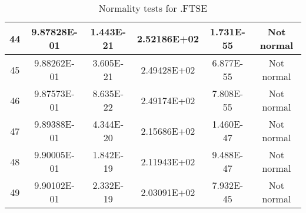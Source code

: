 \begin{table}[h]
\begin{tabular}{|c|c|c|c|c|c|}
		44 & 9.87828E-01 & 1.443E-21 & 2.52186E+02 & 1.731E-55 & Not normal\\\hline
		45 & 9.88262E-01 & 3.605E-21 & 2.49428E+02 & 6.877E-55 & Not normal\\\hline
		46 & 9.87573E-01 & 8.635E-22 & 2.49174E+02 & 7.808E-55 & Not normal\\\hline
		47 & 9.89388E-01 & 4.344E-20 & 2.15686E+02 & 1.460E-47 & Not normal\\\hline
		48 & 9.90005E-01 & 1.842E-19 & 2.11943E+02 & 9.488E-47 & Not normal\\\hline
		49 & 9.90102E-01 & 2.332E-19 & 2.03091E+02 & 7.932E-45 & Not normal\\\hline
	\end{tabular}
	\caption{Normality tests for .FTSE}
\end{table}
